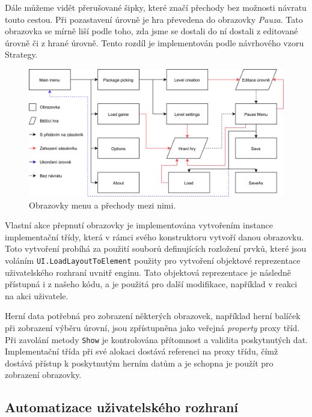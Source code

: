 Dále můžeme vidět přerušované šipky, které značí přechody bez možnosti návratu touto cestou. Při pozastavení úrovně je hra převedena do obrazovky \textit{Pauza}. Tato obrazovka se mírně liší podle toho, zda jsme se dostali do ní dostali z editované úrovně či z hrané úrovně. Tento rozdíl je implementován podle návrhového vzoru Strategy.

\begin{figure}[h]
	\centering
	\includegraphics[width=\textwidth]{img/ScreenStructure.png}
	\caption{Obrazovky menu a přechody mezi nimi.}
	\label{fig:screen_structure}
\end{figure}


Vlastní akce přepnutí obrazovky je implementována vytvořením instance implementační třídy, která v rámci svého konstruktoru vytvoří danou obrazovku. Toto vytvoření probíhá za použití souborů definujících rozložení prvků, které jsou voláním \texttt{UI.LoadLayoutToElement} použity pro vytvoření objektové reprezentace uživatelského rozhraní uvnitř enginu. Tato objektová reprezentace je následně přístupná i z našeho kódu, a je použitá pro další modifikace, například v reakci na akci uživatele.

Herní data potřebná pro zobrazení některých obrazovek, například herní balíček při zobrazení výběru úrovní, jsou zpřístupněna jako veřejná \textit{property} proxy tříd. Při zavolání metody \texttt{Show} je kontrolována přítomnost a validita poskytnutých dat. Implementační třída při své alokaci dostává referenci na proxy třídu, čímž dostává přístup k poskytnutým herním datům a je schopna je použít pro zobrazení obrazovky.



\subsection{Automatizace uživatelského rozhraní}

